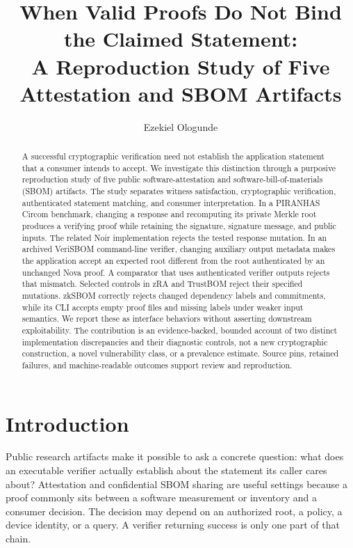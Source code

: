 \documentclass[sigconf,nonacm]{acmart}
\title{When Valid Proofs Do Not Bind the Claimed Statement:\\A Reproduction Study of Five Attestation and SBOM Artifacts}
\author{Ezekiel Ologunde}
\affiliation{\institution{Independent Researcher}\city{Boston}\state{MA}\country{USA}}
\begin{document}
\begin{abstract}
A successful cryptographic verification need not establish the application statement that a consumer intends to accept. We investigate this distinction through a purposive reproduction study of five public software-attestation and software-bill-of-materials (SBOM) artifacts. The study separates witness satisfaction, cryptographic verification, authenticated statement matching, and consumer interpretation. In a PIRANHAS Circom benchmark, changing a response and recomputing its private Merkle root produces a verifying proof while retaining the signature, signature message, and public inputs. The related Noir implementation rejects the tested response mutation. In an archived VeriSBOM command-line verifier, changing auxiliary output metadata makes the application accept an expected root different from the root authenticated by an unchanged Nova proof. A comparator that uses authenticated verifier outputs rejects that mismatch. Selected controls in zRA and TrustBOM reject their specified mutations. zkSBOM correctly rejects changed dependency labels and commitments, while its CLI accepts empty proof files and missing labels under weaker input semantics. We report these as interface behaviors without asserting downstream exploitability. The contribution is an evidence-backed, bounded account of two distinct implementation discrepancies and their diagnostic controls, not a new cryptographic construction, a novel vulnerability class, or a prevalence estimate. Source pins, retained failures, and machine-readable outcomes support review and reproduction.
\end{abstract}
\maketitle

\section{Introduction}
Public research artifacts make it possible to ask a concrete question: what does an executable verifier actually establish about the statement its caller cares about? Attestation and confidential SBOM sharing are useful settings because a proof commonly sits between a software measurement or inventory and a consumer decision. The decision may depend on an authorized root, a policy, a device identity, or a query. A verifier returning success is only one part of that chain.
\end{document}
